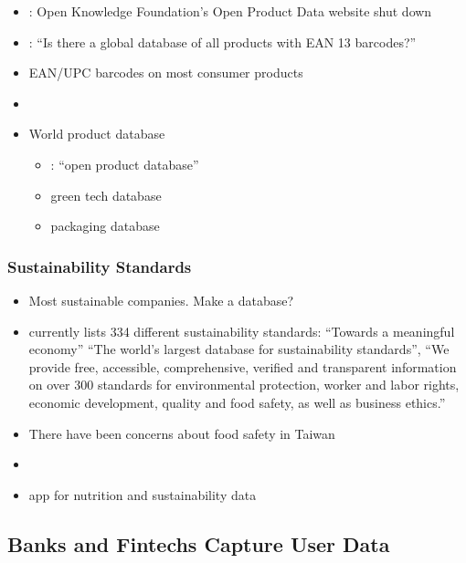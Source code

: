 \documentclass[
  letterpaper,
  DIV=11,
  numbers=noendperiod]{scrartcl}
\providecommand{\tightlist}{%
  \setlength{\itemsep}{0pt}\setlength{\parskip}{0pt}}\usepackage{longtable,booktabs,array}
\begin{document}
\begin{itemize}
\tightlist
\item
  \citet{OpenProductData}: Open Knowledge Foundation's Open Product Data
  website shut down
\item
  \citet{hakonbogenThereGlobalDatabase2016}: ``Is there a global
  database of all products with EAN 13 barcodes?''
\item
  \citet{gs1EANUPCBarcodes} EAN/UPC barcodes on most consumer products
\item
  \citet{semantics3WhyUPCDoesn2017}
\item
  World product database

  \begin{itemize}
  \item
    \citet{DatakickOpenProduct}: ``open product database''
  \item
    \citet{WIPOGREENGlobal} green tech database
  \item
    \citet{PackagingWorld} packaging database
  \end{itemize}
\end{itemize}

\subsubsection{Sustainability Standards}\label{sustainability-standards}

\begin{itemize}
\item
  Most sustainable companies. Make a database?
\item
  \citet{internationaltradecentreStandardsMap2022} currently lists 334
  different sustainability standards: ``Towards a meaningful economy''
  ``The world's largest database for sustainability standards'', ``We
  provide free, accessible, comprehensive, verified and transparent
  information on over 300 standards for environmental protection, worker
  and labor rights, economic development, quality and food safety, as
  well as business ethics.''
\item
  There have been concerns about food safety in Taiwan
\item
  \citet{SustainabilityIntelligenceFood}
\item
  \citet{OpenFoodFacts} app for nutrition and sustainability data
\end{itemize}

\subsection{Banks and Fintechs Capture User
Data}\label{banks-and-fintechs-capture-user-data}
\end{document}
